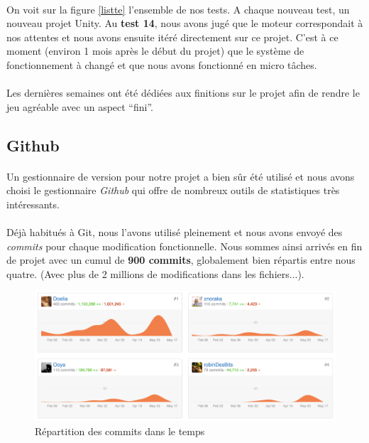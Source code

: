 \paragraph{}
On voit sur la figure \ref{listte} l'ensemble de nos tests. A chaque nouveau test, un nouveau projet Unity. Au \textbf{test 14}, nous avons jugé que le moteur correspondait à nos attentes et nous avons ensuite itéré directement sur ce projet. C’est à ce moment (environ 1 mois après le début du projet) que le système de fonctionnement à changé et que nous avons fonctionné en micro tâches.

\paragraph{}
Les dernières semaines ont été dédiées aux finitions sur le projet afin de rendre le jeu agréable avec un aspect “fini”.

\subsection{Github}

\paragraph{}
Un gestionnaire de version pour notre projet a bien sûr été utilisé et nous avons choisi le gestionnaire \emph{Github} qui offre de nombreux outils de statistiques très intéressants.

\paragraph{}
Déjà habitués à Git, nous l'avons utilisé pleinement et nous avons envoyé des \emph{commits} pour chaque modification fonctionnelle. Nous sommes ainsi arrivés en fin de projet avec un cumul de \textbf{900 commits}, globalement bien répartis entre nous quatre. (Avec plus de 2 millions de modifications dans les fichiers...).

\begin{figure}[H]\centering
  \includegraphics[scale=.85]{./img/github_commits.png}
  \caption{Répartition des commits dans le temps}
  \label{github_commits}
\end{figure}

